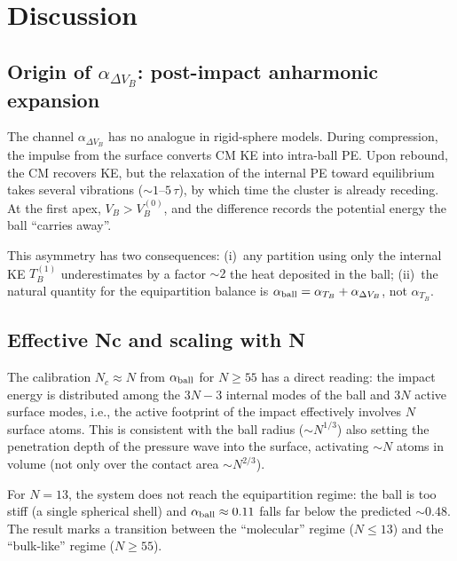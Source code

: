 \documentclass[aps,pre,twocolumn,reprint,superscriptaddress]{revtex4-2}
\begin{document}
\section{Discussion}
\label{sec:discusion}

\subsection{Origin of \texorpdfstring{$\alpha_{\Delta V_B}$}{α\_ΔVB}:
post-impact anharmonic expansion}
\label{sec:anarmonico}

The channel $\alpha_{\Delta V_B}$ has no analogue in rigid-sphere models.
During compression, the impulse from the surface converts CM KE into
intra-ball PE. Upon rebound, the CM recovers KE, but the relaxation of the
internal PE toward equilibrium takes several vibrations
($\sim1$--$5\,\tau$), by which time the cluster is already receding. At the
first apex, $V_B>V_B^{(0)}$, and the difference records the potential
energy the ball ``carries away''.

This asymmetry has two consequences: (i)~any partition using only the
internal KE $T_B^{(1)}$ underestimates by a factor $\sim2$ the heat
deposited in the ball; (ii)~the natural quantity for the equipartition
balance is $\alpha_{\rm ball}=\alpha_{T_B}+\alpha_{\Delta V_B}$, not
$\alpha_{T_B}$.

\subsection{Effective Nc and scaling with N}
\label{sec:Nc_interpretacion}

The calibration $N_c\approx N$ from $\alpha_{\rm ball}$ for $N\geq55$ has a
direct reading: the impact energy is distributed among the $3N-3$ internal
modes of the ball and $3N$ active surface modes, i.e., the active footprint
of the impact effectively involves $N$ surface atoms. This is consistent
with the ball radius ($\sim N^{1/3}$) also setting the penetration depth of
the pressure wave into the surface, activating $\sim N$ atoms in volume
(not only over the contact area $\sim N^{2/3}$).

For $N=13$, the system does not reach the equipartition regime: the ball is
too stiff (a single spherical shell) and $\alpha_{\rm ball}\approx0.11$
falls far below the predicted $\sim0.48$. The result marks a transition
between the ``molecular'' regime ($N\leq13$) and the ``bulk-like'' regime
($N\geq55$).
\end{document}

